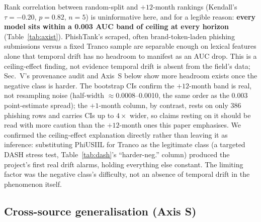 \documentclass[conference]{IEEEtran}
\begin{document}
Rank correlation between random-split and $+12$-month rankings (Kendall's
$\tau=-0.20$, $p=0.82$, $n=5$) is uninformative here, and for a legible
reason: \textbf{every model sits within a 0.003 AUC band of ceiling at every horizon} (Table~\ref{tab:axist}). PhishTank's scraped, often
brand-token-laden phishing submissions versus a fixed Tranco sample are
separable enough on lexical features alone that temporal drift has no
headroom to manifest as an AUC drop. This is a ceiling-effect finding, not
evidence temporal drift is absent from the field's data; Sec.~V's
provenance audit and Axis~S below show more headroom exists once the
negative class is harder. The bootstrap CIs confirm the $+12$-month band
is real, not resampling noise (half-width $\approx$0.0008--0.0010, the
same order as the 0.003 point-estimate spread); the $+1$-month column,
by contrast, rests on only 386 phishing rows and carries CIs up to
$4\times$ wider, so claims resting on it should be read with more caution
than the $+12$-month ones this paper emphasises. We confirmed the
ceiling-effect explanation directly rather than leaving it as inference:
substituting PhiUSIIL for Tranco as the legitimate class (a targeted DASH
stress test, Table~\ref{tab:dash}'s ``harder-neg.'' column) produced the project's first real drift alarms, holding everything else
constant. The limiting factor was the negative class's difficulty, not an absence
of temporal drift in the phenomenon itself.

\subsection{Cross-source generalisation (Axis S)}
\label{sec:axis-s-results}
\end{document}
